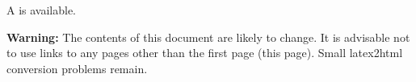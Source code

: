 \def\eps@scaling{1.0}%
\newcommand\epsscale[1]{\gdef\eps@scaling{#1}}%
\newcommand\plotone[1]{%
 \typeout{Plotone included the file #1}
 \centering
 \leavevmode
 \texttt{[image: \#1]}%
}%

\newcommand\plottwo[2]{{%
 \typeout{Plottwo included the files #1 #2}
 \centering
 \leavevmode
 \columnwidth=.45\columnwidth
 \texttt{[image: \#1]}%
 \hfil
 \texttt{[image: \#2]}%
}}%




\setlength{\parindent}{0pt}
\setlength{\parskip}{2.5mm}

\maketitle

\begin{htmlonly}
A 
is available. 

{\bf Warning:} The contents of this document are likely to change.
It is advisable not to use links to any pages other than the first
page (this page). Small latex2html conversion problems remain.
\end{htmlonly}

%
%
%


\pagestyle{empty}

\newpage

\pagestyle{headings}
\tableofcontents
{}
\listoftables
{}
\listoffigures
{}

